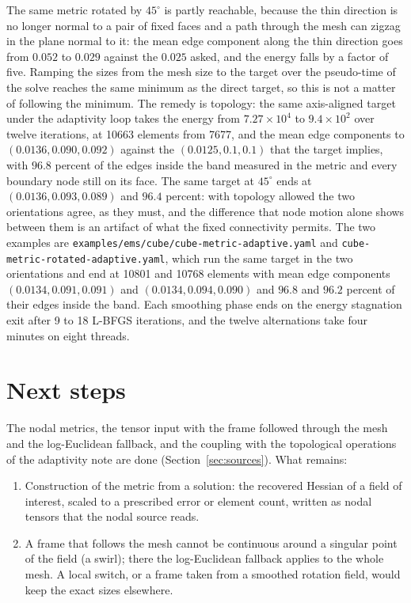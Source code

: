 \documentclass[11pt]{article}
\newcommand{\code}[1]{\texttt{#1}}
\begin{document}
The same metric rotated by $45^\circ$ is partly reachable, because the
thin direction is no longer normal to a pair of fixed faces and a path
through the mesh can zigzag in the plane normal to it: the mean edge
component along the thin direction goes from $0.052$ to $0.029$ against
the $0.025$ asked, and the energy falls by a factor of five. Ramping the
sizes from the mesh size to the target over the pseudo-time of the solve
reaches the same minimum as the direct target, so this is not a matter of
following the minimum. The remedy is topology: the same axis-aligned
target under the adaptivity loop takes the energy from
$7.27 \times 10^4$ to $9.4 \times 10^2$ over twelve iterations, at 10663
elements from 7677, and the mean edge components to
$(0.0136, 0.090, 0.092)$ against the $(0.0125, 0.1, 0.1)$ that the target
implies, with $96.8$ percent of the edges inside the band measured in the
metric and every boundary node still on its face. The same target at
$45^\circ$ ends at $(0.0136, 0.093, 0.089)$ and $96.4$ percent: with
topology allowed the two orientations agree, as they must, and the
difference that node motion alone shows between them is an artifact of
what the fixed connectivity permits. The two examples are
\code{examples/ems/cube/cube-metric-adaptive.yaml} and
\code{cube-metric-rotated-adaptive.yaml}, which run the same target in the
two orientations and end at 10801 and 10768 elements with mean edge
components $(0.0134, 0.091, 0.091)$ and $(0.0134, 0.094, 0.090)$ and
$96.8$ and $96.2$ percent of their edges inside the band. Each smoothing
phase ends on the energy stagnation exit after 9 to 18 L-BFGS iterations,
and the twelve alternations take four minutes on eight threads.

\section{Next steps}
\label{sec:next}

The nodal metrics, the tensor input with the frame followed through the
mesh and the log-Euclidean fallback, and the coupling with the
topological operations of the adaptivity note are done
(Section~\ref{sec:sources}). What remains:
\begin{enumerate}[itemsep=2pt]
\item Construction of the metric from a solution: the recovered Hessian
  of a field of interest, scaled to a prescribed error or element count,
  written as nodal tensors that the nodal source reads.
\item A frame that follows the mesh cannot be continuous around a
  singular point of the field (a swirl); there the log-Euclidean fallback
  applies to the whole mesh. A local switch, or a frame taken from a
  smoothed rotation field, would keep the exact sizes elsewhere.
\end{enumerate}
\end{document}
